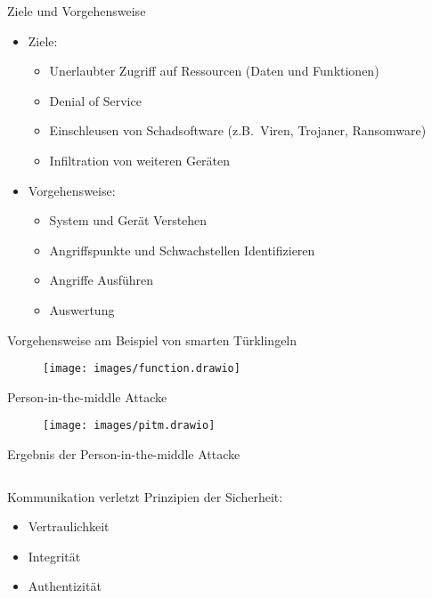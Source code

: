\documentclass[11pt, aspectratio=169, modernfonts]{beamer}
\begin{document}
    \begin{frame}{Ziele und Vorgehensweise}
        \begin{itemize}
            \item Ziele:
            \begin{itemize}
                \item Unerlaubter Zugriff auf Ressourcen (Daten und Funktionen)
                \item Denial of Service
                \item Einschleusen von Schadsoftware (z.B.~Viren, Trojaner, Ransomware)
                \item Infiltration von weiteren Geräten
            \end{itemize}
            \item Vorgehensweise:
            \begin{itemize}
                \item System und Gerät Verstehen
                \item Angriffspunkte und Schwachstellen Identifizieren
                \item Angriffe Ausführen
                \item Auswertung
            \end{itemize}
        \end{itemize}
    \end{frame}

    \begin{frame}{Vorgehensweise am Beispiel von smarten Türklingeln}
        \begin{figure}
            \texttt{[image: images/function.drawio]}\label{fig:function}
        \end{figure}
    \end{frame}

    \begin{frame}{Person-in-the-middle Attacke}
        \begin{figure}
            \texttt{[image: images/pitm.drawio]}\label{fig:pitm}
        \end{figure}
    \end{frame}

    \begin{frame}[fragile]{Ergebnis der Person-in-the-middle Attacke}
        \begin{columns}
            \begin{column}{0.5\textwidth}
                Kommunikation verletzt Prinzipien der Sicherheit:
                \begin{itemize}
                    \item Vertraulichkeit
                    \item Integrität
                    \item Authentizität
                \end{itemize}
            \end{column}
            \begin{column}{0.5\textwidth}
            \end{column}
        \end{columns}
    \end{frame}
\end{document}

